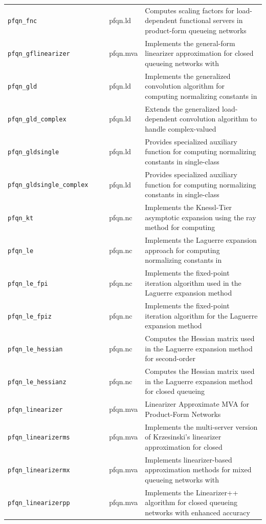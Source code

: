 \begin{footnotesize}
\begin{longtable}{|p{0.4\linewidth}|p{0.1\linewidth}|p{0.5\linewidth}|}
\texttt{pfqn\_fnc} & pfqn.ld & Computes scaling factors for load-dependent functional servers in product-form queueing networks\\
\texttt{pfqn\_gflinearizer} & pfqn.mva & Implements the general-form linearizer approximation for closed queueing networks with\\
\texttt{pfqn\_gld} & pfqn.ld & Implements the generalized convolution algorithm for computing normalizing constants in\\
\texttt{pfqn\_gld\_complex} & pfqn.ld & Extends the generalized load-dependent convolution algorithm to handle complex-valued\\
\texttt{pfqn\_gldsingle} & pfqn.ld & Provides specialized auxiliary function for computing normalizing constants in single-class\\
\texttt{pfqn\_gldsingle\_complex} & pfqn.ld & Provides specialized auxiliary function for computing normalizing constants in single-class\\
\texttt{pfqn\_kt} & pfqn.nc & Implements the Knessl-Tier asymptotic expansion using the ray method for computing\\
\texttt{pfqn\_le} & pfqn.nc & Implements the Laguerre expansion approach for computing normalizing constants in\\
\texttt{pfqn\_le\_fpi} & pfqn.nc & Implements the fixed-point iteration algorithm used in the Laguerre expansion method\\
\texttt{pfqn\_le\_fpiz} & pfqn.nc & Implements the fixed-point iteration algorithm for the Laguerre expansion method\\
\texttt{pfqn\_le\_hessian} & pfqn.nc & Computes the Hessian matrix used in the Laguerre expansion method for second-order\\
\texttt{pfqn\_le\_hessianz} & pfqn.nc & Computes the Hessian matrix used in the Laguerre expansion method for closed queueing\\
\texttt{pfqn\_linearizer} & pfqn.mva & Linearizer Approximate MVA for Product-Form Networks\\
\texttt{pfqn\_linearizerms} & pfqn.mva & Implements the multi-server version of Krzesinski's linearizer approximation for closed\\
\texttt{pfqn\_linearizermx} & pfqn.mva & Implements linearizer-based approximation methods for mixed queueing networks with\\
\texttt{pfqn\_linearizerpp} & pfqn.mva & Implements the Linearizer++ algorithm for closed queueing networks with enhanced accuracy\\

\end{longtable}
\end{footnotesize}
